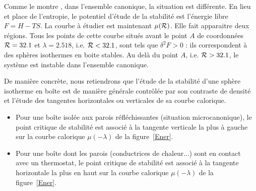 	Comme le montre \cite{2002A&A...381..340C}, dans l'ensemble canonique, la situation est différente. En lieu et
	place de l'entropie, le potentiel d'étude de la stabilité est l'énergie libre $F=H-TS$. La courbe à étudier est
	maintenant $\mu(\mathcal{R})$. Elle fait apparaitre deux régions. Tous les points de cette courbe situés avant le point
	$A$ de coordonnées $\mathcal{R}=32.1$ et $\lambda=2.518$, i.e. $\mathcal{R}<32.1$, sont tels que $\delta^2 F>0$ : ils
	correspondent à des sphères isothermes en boite stables. Au delà du point $A$, i.e. $\mathcal{R}>32.1$, le système est
	instable dans l'ensemble canonique.
	
	De manière concrète, nous retiendrons que l'étude de la stabilité d'une sphère isotherme en boîte est de manière générale contrôlée par son
	contraste de densité et l'étude des tangentes horizontales ou verticales de sa courbe calorique.   
	\begin{itemize}

		\item Pour une boîte isolée aux parois réfléchissantes (situation microcanonique), le point critique de
			stabilité est associé à la tangente verticale la plus à gauche sur la courbe calorique
			$\mu(-\lambda)$ de la figure~\ref{Ener}.

		\item Pour une boîte dont les parois (conductrices de chaleur...) sont en contact avec un thermostat, le
			point critique de stabilité est associé à la tangente horizontale la plus en haut sur la courbe
			calorique $\mu(-\lambda)$ de la figure~\ref{Ener}.

	\end{itemize}
	
